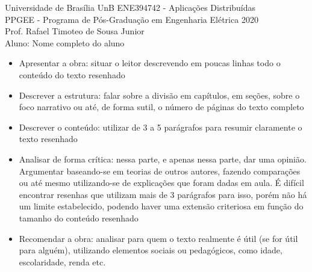 \documentclass[12pt, a4paper]{article}
\newcommand{\+}[1]{\ensuremath{\mathbf{#1}}} %
\begin{document}
\noindent Universidade de Brasília UnB \hfill ENE394742 - Aplicações Distribuídas\\

\noindent PPGEE - Programa de Pós-Graduação em Engenharia Elétrica \hfill 2020\\ %
\noindent Prof. Rafael Timoteo de Sousa Junior \\
\noindent Aluno: Nome completo do aluno \\ %
\justify


\begin{itemize}
    \item Apresentar a obra: situar o leitor descrevendo em poucas linhas todo o conteúdo do texto resenhado
    \item Descrever a estrutura: falar sobre a divisão em capítulos, em seções, sobre o foco narrativo ou até, de forma sutil, o número de páginas do texto completo
    \item Descrever o conteúdo: utilizar de 3 a 5 parágrafos para resumir claramente o texto resenhado
    \item Analisar de forma crítica: nessa parte, e apenas nessa parte, dar uma opinião. Argumentar baseando-se em teorias de outros autores, fazendo comparações ou até mesmo utilizando-se de explicações que foram dadas em aula. É difícil encontrar resenhas que utilizam mais de 3 parágrafos para isso, porém não há um limite estabelecido, podendo haver uma extensão criteriosa em função do tamanho do conteúdo resenhado
    \item Recomendar a obra: analisar para quem o texto realmente é útil (se for útil para alguém), utilizando elementos sociais ou pedagógicos, como idade, escolaridade, renda etc.
\end{itemize}
\end{document}
